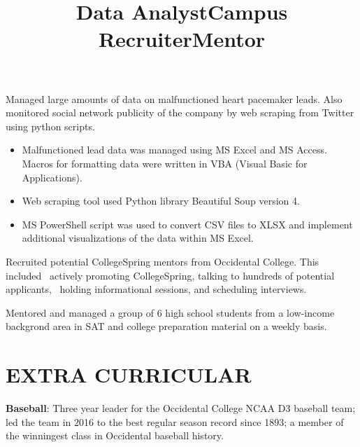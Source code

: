 \documentclass[margin]{res}
\begin{document}
\begin{resume}
\title{\textbf{Data Analyst}}
\begin{position}
	Managed large amounts of data on malfunctioned heart pacemaker leads. Also monitored social network publicity of the company by web scraping from Twitter using python scripts.
	\begin{itemize}
		\item Malfunctioned lead data was managed using MS Excel and MS Access. Macros for formatting data were written in VBA (Visual Basic for Applications).
		\item Web scraping tool used Python library Beautiful Soup version 4.
		\item MS PowerShell script was used to convert CSV files to XLSX and implement additional visualizations of the data within MS Excel.
	\end{itemize}
\end{position}

\title{\textbf{Campus Recruiter}}
\begin{position}
	Recruited potential CollegeSpring mentors from Occidental College. This included 
actively promoting CollegeSpring, talking to hundreds of potential applicants, 
holding informational sessions, and scheduling interviews.
\end{position}

\title{\textbf{Mentor}}
\begin{position}
	Mentored and managed a group of 6 high school students from a low-income backgrond area in SAT and college preparation material on a weekly basis.
\end{position}


\section{EXTRA CURRICULAR}
\par
\textbf{Baseball}: Three year leader for the Occidental College NCAA D3 baseball team; led the team in 2016 to the best regular season record since 1893; a member of the winningest class in Occidental baseball history.
\par


\end{resume}
\end{document}
